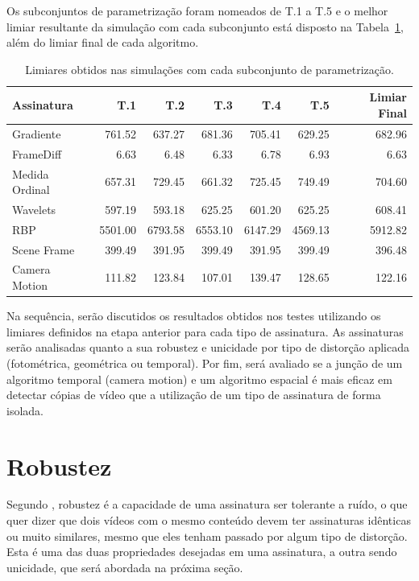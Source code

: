 Os subconjuntos de parametrização foram nomeados de T.1 a T.5 e o melhor limiar resultante da simulação com cada subconjunto está disposto na Tabela~\ref{tab:limiares}, além do limiar final de cada algoritmo.

\begin{table}[h]
	\caption{Limiares obtidos nas simulações com cada subconjunto de parametrização.}
	\label{tab:limiares}
	\begin{tabular}{|l|r|r|r|r|r|r|}
		\hline
		\textbf{Assinatura} & \textbf{T.1} & \textbf{T.2} & \textbf{T.3} & \textbf{T.4} & \textbf{T.5} & \textbf{Limiar Final}\\ \hline
		Gradiente & 761.52 & 637.27 & 681.36 & 705.41 & 629.25 & 682.96\\ \hline
		FrameDiff & 6.63 & 6.48 & 6.33 & 6.78 & 6.93 & 6.63\\ \hline
		Medida Ordinal & 657.31 & 729.45 & 661.32 & 725.45 & 749.49 & 704.60\\ \hline
		Wavelets & 597.19 & 593.18 & 625.25 & 601.20 & 625.25 & 608.41\\ \hline
		RBP & 5501.00 & 6793.58 & 6553.10 & 6147.29 & 4569.13 & 5912.82\\ \hline
		Scene Frame & 399.49 & 391.95 & 399.49 & 391.95 & 399.49 & 396.48\\ \hline
		Camera Motion & 111.82 & 123.84 & 107.01 & 139.47 & 128.65 & 122.16\\ \hline
	\end{tabular}
\end{table}

Na sequência, serão discutidos os resultados obtidos nos testes utilizando os limiares definidos na etapa anterior para cada tipo de assinatura. As assinaturas serão analisadas quanto a sua robustez e unicidade por tipo de distorção aplicada (fotométrica, geométrica ou temporal). Por fim, será avaliado se a junção de um algoritmo temporal (camera motion) e um algoritmo espacial é mais eficaz em detectar cópias de vídeo que a utilização de um tipo de assinatura de forma isolada. 

\section{Robustez}

Segundo , robustez é a capacidade de uma assinatura ser tolerante a ruído, o que quer dizer que dois vídeos com o mesmo conteúdo devem ter assinaturas idênticas ou muito similares, mesmo que eles tenham passado por algum tipo de distorção. Esta é uma das duas propriedades desejadas em uma assinatura, a outra sendo unicidade, que será abordada na próxima seção.

